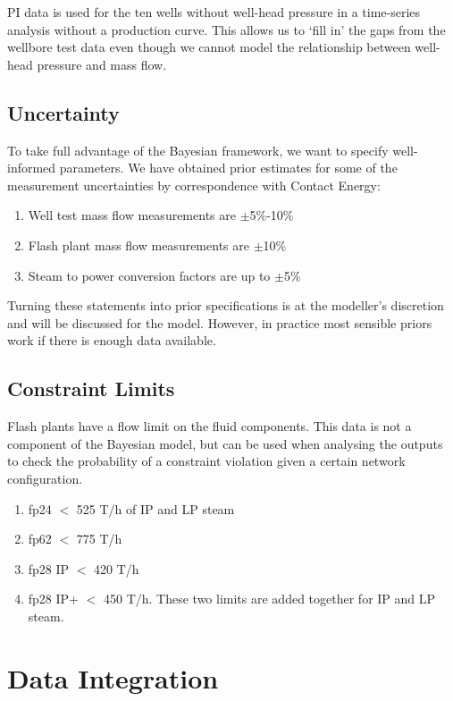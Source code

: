 \documentclass[a4paper, 12pt]{article}
\begin{document}
PI data is used for the ten wells without well-head pressure in a time-series analysis without a production curve. This allows us to `fill in' the gaps from the wellbore test data even though we cannot model the relationship between well-head pressure and mass flow.

\subsection{Uncertainty}
To take full advantage of the Bayesian framework, we want to specify well-informed parameters. We have obtained prior estimates for some of the measurement uncertainties by correspondence with Contact Energy:

\begin{enumerate}
\item Well test mass flow measurements are $\pm$5\%-10\%
\item Flash plant mass flow measurements are $\pm$10\%
\item Steam to power conversion factors are up to $\pm$5\%
\end{enumerate}

Turning these statements into prior specifications is at the modeller's discretion and will be discussed for the model. However, in practice most sensible priors work if there is enough data available.

\subsection{Constraint Limits}
Flash plants have a flow limit on the fluid components. This data is not a component of the Bayesian model, but can be used when analysing the outputs to check the probability of a constraint violation given a certain network configuration.
\begin{enumerate}
\item fp24 $<$ 525 T/h of IP and LP steam
\item fp62 $<$ 775 T/h
\item fp28 IP $<$ 420 T/h
\item fp28 IP+ $<$ 450 T/h. These two limits are added together for IP and LP steam.
\end{enumerate}

\section{Data Integration}
\end{document}
